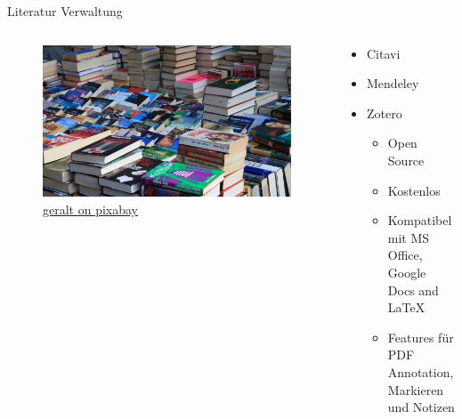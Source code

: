 \documentclass[aspectratio=169,shownotes]{beamer}
\begin{document}
\begin{frame}{Literatur Verwaltung}
    \begin{columns}[t]
        \begin{column}{0.39\textwidth}      
            \vspace{-2em} 
            \begin{figure}[t]
                \begin{flushleft}
                    \includegraphics[height=0.8\textheight,trim={11cm 0 15cm 0},clip]{graphics/Flohmarkt.jpg}         
                    \caption*{\href{https://pixabay.com/de/photos/flohmarkt-bücher-kiste-stöbern-237460/}{geralt on pixabay}}    
                \end{flushleft}
            \end{figure}
        \end{column}          
        \begin{column}{0.69\textwidth}
            \begin{itemize}
                \item Citavi
                \item Mendeley
                \item Zotero
                \pause
                \begin{itemize}
                    \item Open Source
                    \item Kostenlos
                    \item Kompatibel mit MS Office, Google Docs and LaTeX
                    \item Features für PDF Annotation, Markieren und Notizen
                \end{itemize}
            \end{itemize}           
        \end{column}        
    \end{columns}    
\end{frame}
\end{document}
